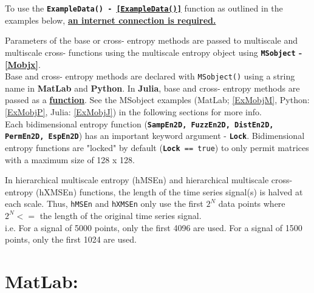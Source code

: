 \documentclass[12pt, a4paper, titlepage, openany]{book}
\begin{document}
\begin{tcolorbox}[sharp corners, colback=ehone!10, colframe=ehone, title=\textbf{NOTE}, label={BiBox}]

To use the \texttt{\textbf{ExampleData() - \ref{ExampleData()}}} function as outlined in the examples below, \underline{\textbf{an internet connection is required.}}\\
\end{tcolorbox}

\begin{tcolorbox}[sharp corners, colback=ehone!10, colframe=ehone, title=\textbf{THINGS TO REMEMBER}, label={BiBox}]

Parameters of the base or cross- entropy methods are passed to multiscale and multiscale cross- functions using the multiscale entropy object using \textbf{\texttt{MSobject} - \ref{Mobjx}}.\\
Base and cross- entropy methods are declared with \texttt{MSobject()} using a string name in \textbf{MatLab} and \textbf{Python}. In \textbf{Julia}, base and cross- entropy methods are passed as a \textbf{\underline{function}}. See the MSobject examples (MatLab; \ref{ExMobjM}, Python:  \ref{ExMobjP}, Julia: \ref{ExMobjJ}) in the following sections for more info.\\
\newline
Each bidimensional entropy function (\texttt{\textbf{SampEn2D, FuzzEn2D, DistEn2D, PermEn2D, EspEn2D}}) has an important keyword argument - \texttt{\textbf{Lock}}. Bidimensional entropy functions are "locked" by default (\texttt{\textbf{Lock} == true}) to only permit matrices with a maximum size of 128 x 128.\\ \newline

In hierarchical multiscale entropy (hMSEn) and hierarchical multiscale cross-entropy (hXMSEn) functions, the length of the time series signal(s) is halved at each scale. Thus, \texttt{hMSEn} and \texttt{hXMSEn} only use the first $2^N$ data points where  $2^N <=$ the length of the original time series signal.\\
i.e. For a signal of 5000 points, only the first 4096 are used. For a signal of 1500 points, only the first 1024 are used.
\end{tcolorbox}



\newpage
\section{MatLab:}
\end{document}
